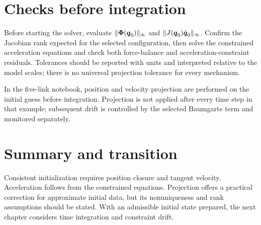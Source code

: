 \documentclass[../main.tex]{subfiles}
\begin{document}
\section{Checks before integration}

Before starting the solver, evaluate $\|\boldsymbol{\Phi}(\boldsymbol{q}_0)\|_\infty$ and $\|J(\boldsymbol{q}_0)\dot{\boldsymbol{q}}_0\|_\infty$. Confirm the Jacobian rank expected for the selected configuration, then solve the constrained acceleration equations and check both force-balance and acceleration-constraint residuals. Tolerances should be reported with units and interpreted relative to the model scales; there is no universal projection tolerance for every mechanism.

In the five-link notebook, position and velocity projection are performed on the initial guess before integration. Projection is not applied after every time step in that example; subsequent drift is controlled by the selected Baumgarte term and monitored separately.

\section{Summary and transition}

Consistent initialization requires position closure and tangent velocity. Acceleration follows from the constrained equations. Projection offers a practical correction for approximate initial data, but its nonuniqueness and rank assumptions should be stated. With an admissible initial state prepared, the next chapter considers time integration and constraint drift.

\ifSubfilesClassLoaded{\backmatter\bookbibliography}{}
\end{document}

